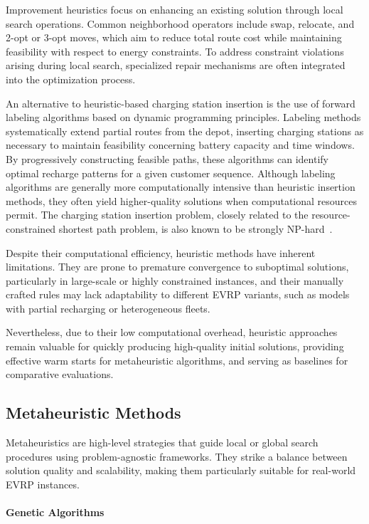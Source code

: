 Improvement heuristics focus on enhancing an existing solution through local search operations.  
Common neighborhood operators include swap, relocate, and 2-opt or 3-opt moves, which aim to reduce total route cost while maintaining feasibility with respect to energy constraints.  
To address constraint violations arising during local search, specialized repair mechanisms are often integrated into the optimization process.

An alternative to heuristic-based charging station insertion is the use of forward labeling algorithms based on dynamic programming principles.  
Labeling methods systematically extend partial routes from the depot, inserting charging stations as necessary to maintain feasibility concerning battery capacity and time windows.  
By progressively constructing feasible paths, these algorithms can identify optimal recharge patterns for a given customer sequence.  
Although labeling algorithms are generally more computationally intensive than heuristic insertion methods, they often yield higher-quality solutions when computational resources permit.  
The charging station insertion problem, closely related to the resource-constrained shortest path problem, is also known to be strongly NP-hard~\cite{hiermann2016electric}.

Despite their computational efficiency, heuristic methods have inherent limitations.  
They are prone to premature convergence to suboptimal solutions, particularly in large-scale or highly constrained instances, and their manually crafted rules may lack adaptability to different EVRP variants, such as models with partial recharging or heterogeneous fleets.

Nevertheless, due to their low computational overhead, heuristic approaches remain valuable for quickly producing high-quality initial solutions, providing effective warm starts for metaheuristic algorithms, and serving as baselines for comparative evaluations.

\subsection{Metaheuristic Methods}

Metaheuristics are high-level strategies that guide local or global search procedures using problem-agnostic frameworks. They strike a balance between solution quality and scalability, making them particularly suitable for real-world EVRP instances.

\paragraph{Genetic Algorithms}

